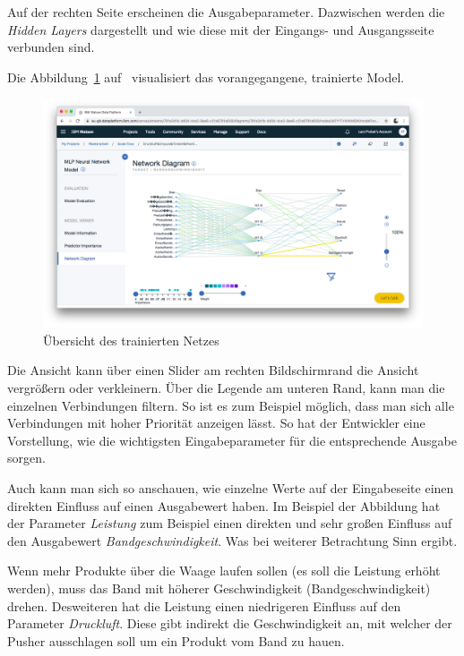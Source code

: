 Auf der rechten Seite erscheinen die Ausgabeparameter. Dazwischen werden die \textit{Hidden Layers} dargestellt und wie
diese mit der Eingangs- und Ausgangsseite verbunden sind.

Die Abbildung~\ref{fig:umsetzung_model_network_diagram} auf~\pageref{fig:umsetzung_model_network_diagram} visualisiert
das vorangegangene, trainierte Model.

\begin{figure}[h]
    \centering
    \includegraphics[width=\textwidth]{images/kapitel_3/model_network_diagram.png}
    \caption{Übersicht des trainierten Netzes}
    \label{fig:umsetzung_model_network_diagram}
\end{figure}

Die Ansicht kann über einen Slider am rechten Bildschirmrand die Ansicht vergrößern oder verkleinern. Über die Legende
am unteren Rand, kann man die einzelnen Verbindungen filtern. So ist es zum Beispiel möglich, dass man sich alle
Verbindungen mit hoher Priorität anzeigen lässt. So hat der Entwickler eine Vorstellung, wie die wichtigsten
Eingabeparameter für die entsprechende Ausgabe sorgen.

Auch kann man sich so anschauen, wie einzelne Werte auf der Eingabeseite einen direkten Einfluss auf einen Ausgabewert
haben. Im Beispiel der Abbildung hat der Parameter \textit{Leistung} zum Beispiel einen direkten und sehr großen
Einfluss auf den Ausgabewert \textit{Bandgeschwindigkeit}. Was bei weiterer Betrachtung Sinn ergibt.

Wenn mehr Produkte über die Waage laufen sollen (es soll die Leistung erhöht werden), muss das Band mit höherer
Geschwindigkeit (Bandgeschwindigkeit) drehen. Desweiteren hat die Leistung einen niedrigeren Einfluss auf den Parameter
\textit{Druckluft}. Diese gibt indirekt die Geschwindigkeit an, mit welcher der Pusher ausschlagen soll um ein Produkt
vom Band zu hauen.

